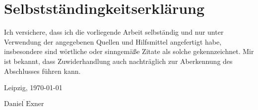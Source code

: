 \pagestyle{empty}

\section*{Selbstst\"andingkeitserkl\"arung}
\begin{center}
Ich versichere, dass ich die vorliegende Arbeit selbständig und nur unter
Verwendung der angegebenen Quellen und Hilfsmittel angefertigt habe,
insbesondere sind wörtliche oder sinngemäße Zitate als solche gekennzeichnet.
Mir ist bekannt, dass Zuwiderhandlung auch nachträglich zur Aberkennung
des Abschlusses führen kann.
\vspace{1cm}
\end{center}
Leipzig, \quad \today \\
\begin{flushright}
$\overline{\text{Daniel Exner}}$
\end{flushright}